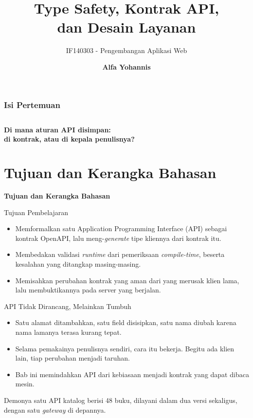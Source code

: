 \documentclass[aspectratio=169, table, 12pt]{beamer}
\title{\Huge Type Safety, Kontrak API,\\ \vspace{10pt} dan Desain Layanan}
\subtitle{IF140303 - Pengembangan Aplikasi Web}
\author{\textbf{Alfa Yohannis}}
\begin{document}
\frame{\titlepage}

\begin{frame}[fragile]
  \frametitle{Isi Pertemuan}
  \vspace{14pt}
  \begin{columns}[t]
    {\small\tableofcontents[sections={1-8}]}

    {\small\tableofcontents[sections={9-15}]}
  \end{columns}
\end{frame}

\begin{frame}{\hfill}
  \centering
  \Huge{\textbf{Di mana aturan API disimpan:\\di kontrak, atau di kepala
  penulisnya?}}
\end{frame}

\section{Tujuan dan Kerangka Bahasan}

\begin{frame}{\hfill}
  \centering
  \Huge{\textbf{Tujuan dan Kerangka Bahasan}}
\end{frame}

\begin{frame}{{\Large Tujuan Pembelajaran}}
  \vspace{10pt}
  \begin{itemize}
    \item Memformalkan satu Application Programming Interface (API) sebagai kontrak OpenAPI, lalu
          meng-\textit{generate} tipe kliennya dari kontrak itu.
    \item Membedakan validasi \textit{runtime} dari pemeriksaan
          \textit{compile-time}, beserta kesalahan yang ditangkap
          masing-masing.
    \item Memisahkan perubahan kontrak yang aman dari yang merusak klien
          lama, lalu membuktikannya pada server yang berjalan.
  \end{itemize}
\end{frame}

\begin{frame}{{\Large API Tidak Dirancang, Melainkan Tumbuh}}
  \vspace{12pt}
  \begin{itemize}
    \item Satu alamat ditambahkan, satu field disisipkan, satu nama diubah
          karena nama lamanya terasa kurang tepat.
    \item Selama pemakainya penulisnya sendiri, cara itu bekerja. Begitu ada
          klien lain, tiap perubahan menjadi taruhan.
    \item Bab ini memindahkan API dari kebiasaan menjadi kontrak yang dapat
          dibaca mesin.
  \end{itemize}
  \vspace{10pt}
  {\small Demonya satu API katalog berisi 48 buku, dilayani dalam dua versi
  sekaligus, dengan satu \textit{gateway} di depannya.}
\end{frame}
\end{document}

